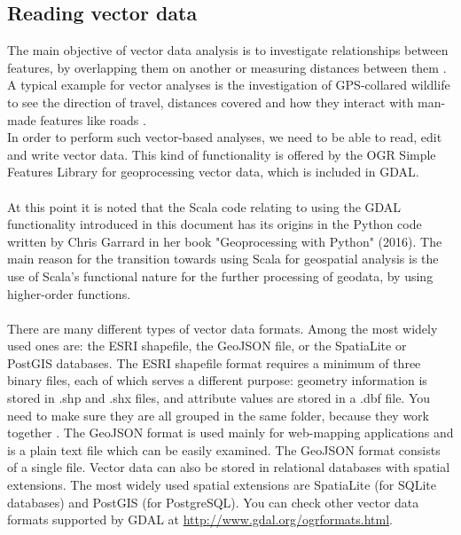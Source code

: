 \documentclass {article}
\begin{document}
\subsection {Reading vector data}

The main objective of vector data analysis is to investigate relationships between features, by overlapping them on another or measuring distances between them \cite{garrard_geoprocessing_2016}. 
A typical example for vector analyses is the investigation of GPS-collared wildlife to see the direction of travel, distances covered and how they interact with man-made features like roads \cite{garrard_geoprocessing_2016}. \\
In order to perform such vector-based analyses, we need to be able to read, edit and write vector data. This kind of functionality is offered by the OGR Simple Features Library for geoprocessing vector data, which is included in GDAL. \\
\\
At this point it is noted that the Scala code relating to using the GDAL functionality introduced in this document has its origins in the Python code written by Chris Garrard in her book "Geoprocessing with Python" (2016). The main reason for the transition towards using Scala for geospatial analysis is the use of Scala's functional nature for the further processing of geodata, by using higher-order functions. \\
\\
There are many different types of vector data formats. Among the most widely used ones are: the ESRI shapefile, the GeoJSON file, or the SpatiaLite or PostGIS databases. 
The ESRI shapefile format requires a minimum of three binary files, each of which serves a different purpose: geometry information is stored in .shp and .shx files, and attribute values are stored in a .dbf file. You need to make sure they are all grouped in the same folder, because they work together \cite{garrard_geoprocessing_2016}. The GeoJSON format is used mainly for web-mapping applications and is a plain text file which can be easily examined. The GeoJSON format consists of a single file. Vector data can also be stored in relational databases with spatial extensions. The most widely used spatial extensions are SpatiaLite (for SQLite databases) and PostGIS (for PostgreSQL). 
You can check other vector data formats supported by GDAL at \href{http://www.gdal.org/ogr_formats.html}{http://www.gdal.org/ogr\underline{\space}formats.html}. \\ 
\\
\end{document}
